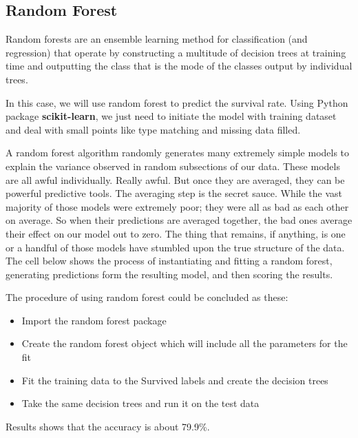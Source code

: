 \subsection{Random Forest}
Random forests are an ensemble learning method for classification (and regression) that operate by constructing a multitude of decision trees at training time and outputting the class that is the mode of the classes output by individual trees.

In this case, we will use random forest to predict the survival rate. Using Python package \textbf{scikit-learn}, we just need to initiate the model with training dataset and deal with small points like type matching and missing data filled.

A random forest algorithm randomly generates many extremely simple models to explain the variance observed in random subsections of our data. These models are all awful individually. Really awful. But once they are averaged, they can be powerful predictive tools. The averaging step is the secret sauce. While the vast majority of those models were extremely poor; they were all as bad as each other on average. So when their predictions are averaged together, the bad ones average their effect on our model out to zero. The thing that remains, if anything, is one or a handful of those models have stumbled upon the true structure of the data. The cell below shows the process of instantiating and fitting a random forest, generating predictions form the resulting model, and then scoring the results.

The procedure of using random forest could be concluded as these:
\begin{itemize}
	\item Import the random forest package
	\item  Create the random forest object which will include all the parameters for the fit
	\item Fit the training data to the Survived labels and create the decision trees
	\item Take the same decision trees and run it on the test data
\end{itemize}

Results shows that the accuracy is about 79.9\%.



